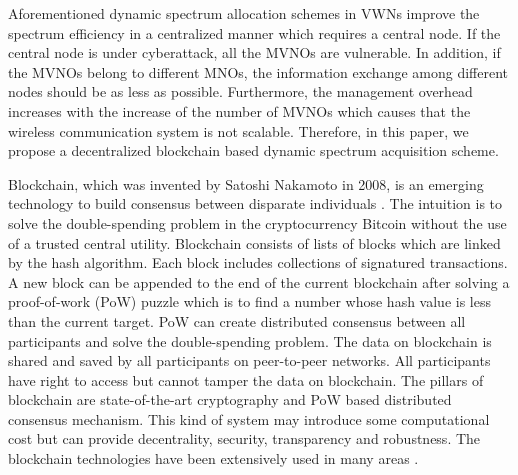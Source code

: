 \documentclass[journal]{IEEEtran}
\begin{document}
Aforementioned dynamic spectrum allocation schemes in VWNs improve the spectrum efficiency in a centralized manner which requires a central node.
If the central node is under cyberattack, all the MVNOs are vulnerable. In addition, if the MVNOs belong to different MNOs, the information exchange among different nodes should be as less as possible. Furthermore, the management overhead increases with the increase of the number of MVNOs which causes that the wireless communication system is not scalable. Therefore, in this paper, we propose a decentralized blockchain based dynamic spectrum acquisition scheme.

Blockchain, which was invented by Satoshi Nakamoto in 2008, is an emerging technology to build consensus between disparate individuals \cite{SNakamoto}. The intuition is to solve the double-spending problem in the cryptocurrency Bitcoin without the use of a trusted central utility. Blockchain consists of lists of blocks which are linked by the hash algorithm. Each block includes collections of signatured transactions. A new block can be appended to the end of the current blockchain after solving a proof-of-work (PoW) puzzle which is to find a number whose hash value is less than the current target. PoW can create distributed consensus between all participants and solve the double-spending problem. The data on blockchain is shared and saved by all participants on peer-to-peer networks. All participants have right to access but cannot tamper the data on blockchain. The pillars of blockchain are state-of-the-art cryptography and PoW based distributed consensus mechanism. This kind of system may introduce some computational cost but can provide decentrality, security, transparency and robustness. The blockchain technologies have been extensively used in many areas \cite{KGai,PKSharma,ZXiong,DBRawat,Munsing,KKotobi}.
\end{document}
